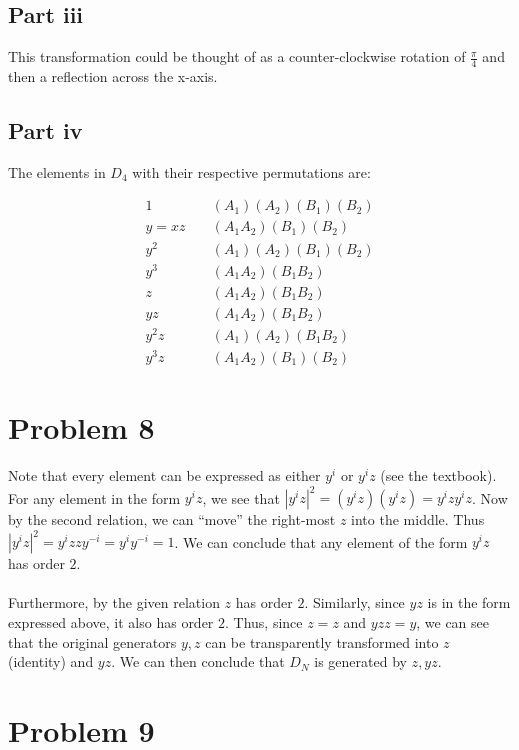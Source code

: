 \documentclass[letterpaper]{article}
\begin{document}
\subsection{Part iii}
\label{Partiii}
This transformation could be thought of as a counter-clockwise rotation of $ \frac{\pi}{4} $ and then a reflection across the x-axis.

\subsection{Part iv}
\label{Partiv}
The elements in $ D_4 $ with their respective permutations are:

\begin{align}
1 & \; & (A_1)(A_2)(B_1)(B_2) \\
y = xz & \; & (A_1 A_2)(B_1)(B_2) \\
y^2 & \; & (A_1)(A_2)(B_1)(B_2) \\
y^3 &\; & (A_1 A_2)(B_1B_2) \\
z &\; & (A_1 A_2)(B_1B_2) \\
yz &\; & (A_1 A_2)(B_1B_2) \\
y^2 z & \; & (A_1)(A_2)(B_1B_2) \\
y^3 z & \; & (A_1A_2)(B_1)(B_2)
\end{align}

\section{Problem 8}
\label{Problem8}

Note that every element can be expressed as either $ y^i $ or $ y^i z $ (see the textbook).
For any element in the form $ y^i z $, we see that $ \left|y^i z\right|^2 = (y^i z)(y^i z) = y^i z y^i z $.
Now by the second relation, we can ``move'' the right-most $ z $ into the middle.
Thus $ \left|y^i z\right|^2 = y^i z z y^{-i} = y^i y^{-i} = 1 $.
We can conclude that any element of the form $ y^i z $ has order $ 2 $.
\\ \\
Furthermore, by the given relation $ z $ has order $ 2 $.
Similarly, since $ yz $ is in the form expressed above, it also has order $ 2 $.
Thus, since $ z = z $ and $ yzz = y $, we can see that the original generators $ y, z $ can be transparently transformed into $ z $ (identity) and $ yz $.
We can then conclude that $ D_N $ is generated by $ z, yz $.

\section{Problem 9}
\label{Problem9}
\end{document}
